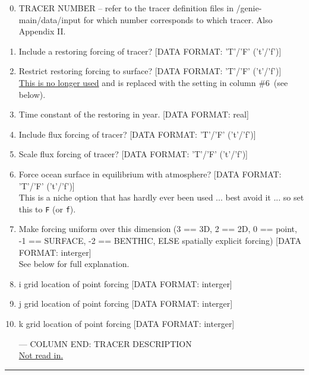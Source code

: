 \vspace{1mm}
\begin{enumerate}[noitemsep]
\setlength{\itemindent}{-0.0in}
\setcounter{enumi}{-1}
\item TRACER NUMBER -- refer to the tracer definition files in \textsf{\footnotesize /genie-main/data/input} for which number corresponds to which tracer. Also Appendix II.
\item Include a restoring forcing of tracer? [DATA FORMAT: 'T'/'F' ('t'/'f')]
\item Restrict restoring forcing to surface? [DATA FORMAT: 'T'/'F' ('t'/'f')]
\\\uline{This is no longer used} and is replaced with the setting in column \#\(6\)\ (see below). 
\item Time constant of the restoring in year. [DATA FORMAT: real]
\item Include flux forcing of tracer? [DATA FORMAT: 'T'/'F' ('t'/'f')] 
\item Scale flux forcing of tracer? [DATA FORMAT: 'T'/'F' ('t'/'f')]
\item Force ocean surface in equilibrium with atmosphere? [DATA FORMAT: 'T'/'F' ('t'/'f')]
\\This is a niche option that has hardly ever been used ... best avoid it ... so set this to \texttt{F} (or \texttt{f}).
\item Make forcing uniform over this dimension (3 == 3D, 2 == 2D, 0 == point, -1 == SURFACE, -2 == BENTHIC, ELSE spatially explicit forcing) [DATA FORMAT: interger]
\\See below for full explanation.
\item i grid location of point forcing [DATA FORMAT: interger]
\item j grid location of point forcing [DATA FORMAT: interger]
\item k grid location of point forcing [DATA FORMAT: interger]
\item[---] COLUMN END: TRACER DESCRIPTION
\\\uline{Not read in.}
\end{enumerate}

\vspace{1mm}
\noindent\rule{4cm}{0.5pt}
\vspace{2mm}

